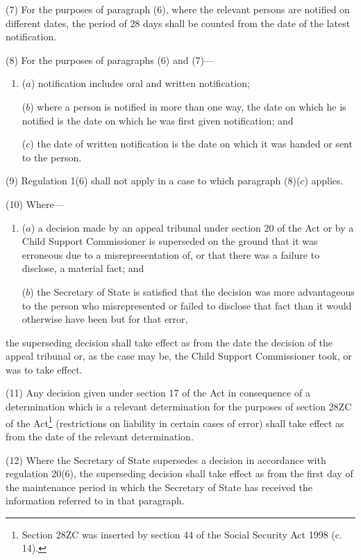 \documentclass[a4paper,12pt]{article}
\begin{document}
(7) For the purposes of paragraph (6), where the relevant persons are notified on different dates, the period of 28 days shall be counted from the date of the latest notification.

(8) For the purposes of paragraphs (6) and (7)---
\begin{enumerate}\item[]
($a$) notification includes oral and written notification;

($b$) where a person is notified in more than one way, the date on which he is notified is the date on which he was first given notification; and

($c$) the date of written notification is the date on which it was handed or sent to the person.
\end{enumerate}

(9) Regulation 1(6) shall not apply in a case to which paragraph (8)($c$) applies.

(10) Where---
\begin{enumerate}\item[]
($a$) a decision made by an appeal tribunal under section 20 of the Act or by a Child Support Commissioner is superseded on the ground that it was erroneous due to a misrepresentation of, or that there was a failure to disclose, a material fact; and

($b$) the Secretary of State is satisfied that the decision was more advantageous to the person who misrepresented or failed to disclose that fact than it would otherwise have been but for that error,
\end{enumerate}
the superseding decision shall take effect as from the date the decision of the appeal tribunal or, as the case may be, the Child Support Commissioner took, or was to take effect.

(11) Any decision given under section 17 of the Act in consequence of a determination which is a relevant determination for the purposes of section 28ZC of the Act\footnote{\frenchspacing Section 28ZC was inserted by section 44 of the Social Security Act 1998 (c. 14).} (restrictions on liability in certain cases of error) shall take effect as from the date of the relevant determination.

(12) Where the Secretary of State supersedes a decision in accordance with regulation 20(6), the superseding decision shall take effect as from the first day of the maintenance period in which the Secretary of State has received the information referred to in that paragraph.
\end{document}
